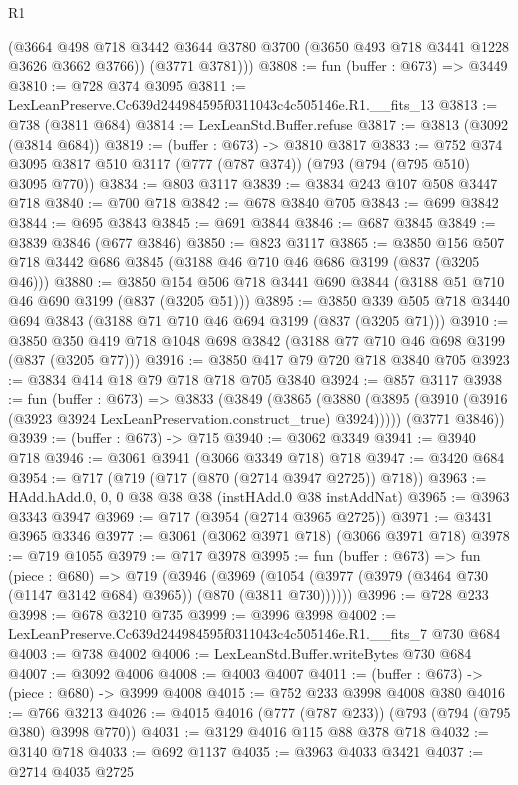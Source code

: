 \begin{lexlean}{R1}
\begin{coremodule}
        (@3664 @498 @718 @3442 @3644 @3780 @3700 (@3650 @493 @718 @3441 @1228 @3626 @3662 @3766))
        (@3771 @3781)))
@3808 := fun (buffer : @673) => @3449
@3810 := @728 @374 @3095
@3811 := LexLeanPreserve.Cc639d244984595f0311043c4c505146e.R1.__fits_13
@3813 := @738 (@3811 @684)
@3814 := LexLeanStd.Buffer.refuse
@3817 := @3813 (@3092 (@3814 @684))
@3819 := (buffer : @673) -> @3810 @3817
@3833 := @752 @374 @3095 @3817 @510 @3117 (@777 (@787 @374)) (@793 (@794 (@795 @510) @3095 @770))
@3834 := @803 @3117
@3839 := @3834 @243 @107 @508 @3447 @718
@3840 := @700 @718
@3842 := @678 @3840 @705
@3843 := @699 @3842
@3844 := @695 @3843
@3845 := @691 @3844
@3846 := @687 @3845
@3849 := @3839 @3846 (@677 @3846)
@3850 := @823 @3117
@3865 := @3850 @156 @507 @718 @3442 @686 @3845 (@3188 @46 @710 @46 @686 @3199 (@837 (@3205 @46)))
@3880 := @3850 @154 @506 @718 @3441 @690 @3844 (@3188 @51 @710 @46 @690 @3199 (@837 (@3205 @51)))
@3895 := @3850 @339 @505 @718 @3440 @694 @3843 (@3188 @71 @710 @46 @694 @3199 (@837 (@3205 @71)))
@3910 := @3850 @350 @419 @718 @1048 @698 @3842 (@3188 @77 @710 @46 @698 @3199 (@837 (@3205 @77)))
@3916 := @3850 @417 @79 @720 @718 @3840 @705
@3923 := @3834 @414 @18 @79 @718 @718 @705 @3840
@3924 := @857 @3117
@3938 := fun (buffer : @673) =>
  @3833
    (@3849
      (@3865 (@3880 (@3895 (@3910 (@3916 (@3923 @3924 LexLeanPreservation.construct_true) @3924)))))
      (@3771 @3846))
@3939 := (buffer : @673) -> @715
@3940 := @3062 @3349
@3941 := @3940 @718
@3946 := @3061 @3941 (@3066 @3349 @718) @718
@3947 := @3420 @684
@3954 := @717 (@719 (@717 (@870 (@2714 @3947 @2725)) @718))
@3963 := HAdd.hAdd.{0, 0, 0} @38 @38 @38 (instHAdd.{0} @38 instAddNat)
@3965 := @3963 @3343 @3947
@3969 := @717 (@3954 (@2714 @3965 @2725))
@3971 := @3431 @3965 @3346
@3977 := @3061 (@3062 @3971 @718) (@3066 @3971 @718)
@3978 := @719 @1055
@3979 := @717 @3978
@3995 := fun (buffer : @673) =>
  fun (piece : @680) =>
  @719
    (@3946
      (@3969 (@1054 (@3977 (@3979 (@3464 @730 (@1147 @3142 @684) @3965)) (@870 (@3811 @730))))))
@3996 := @728 @233
@3998 := @678 @3210 @735
@3999 := @3996 @3998
@4002 := LexLeanPreserve.Cc639d244984595f0311043c4c505146e.R1.__fits_7 @730 @684
@4003 := @738 @4002
@4006 := LexLeanStd.Buffer.writeBytes @730 @684
@4007 := @3092 @4006
@4008 := @4003 @4007
@4011 := (buffer : @673) -> (piece : @680) -> @3999 @4008
@4015 := @752 @233 @3998 @4008 @380
@4016 := @766 @3213
@4026 := @4015 @4016 (@777 (@787 @233)) (@793 (@794 (@795 @380) @3998 @770))
@4031 := @3129 @4016 @115 @88 @378 @718
@4032 := @3140 @718
@4033 := @692 @1137
@4035 := @3963 @4033 @3421
@4037 := @2714 @4035 @2725

\end{coremodule}
\end{lexlean}
